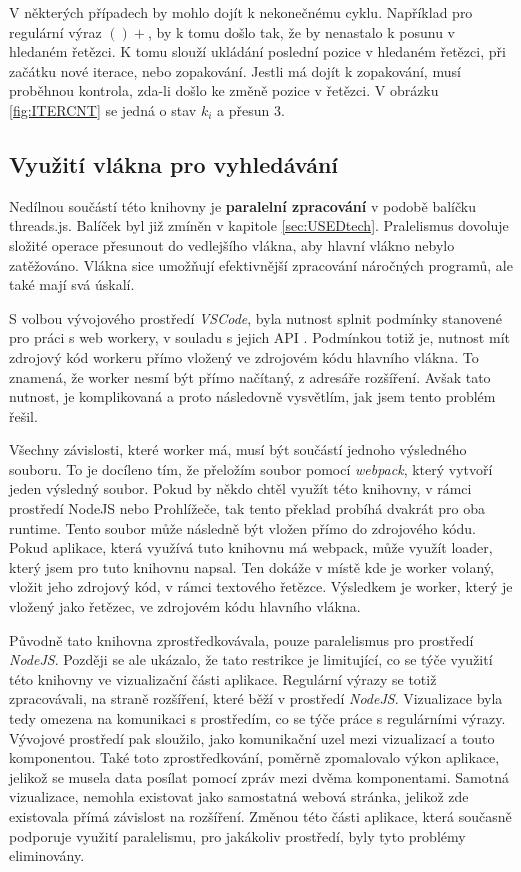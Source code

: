 V některých případech by mohlo dojít k nekonečnému cyklu.
Například pro regulární výraz $()+$, by k tomu došlo tak, že by nenastalo k posunu v hledaném řetězci.
K tomu slouží ukládání poslední pozice v hledaném řetězci, při začátku nové iterace, nebo zopakování.
Jestli má dojít k zopakování, musí proběhnou kontrola, zda-li došlo ke změně pozice v řetězci.
V obrázku \ref{fig:ITERCNT} se jedná o stav $k_i$ a přesun $3$.

\subsection*{Využití vlákna pro vyhledávání}
Nedílnou součástí této knihovny je \textbf{paralelní zpracování} v podobě balíčku threads.js.
Balíček byl již zmíněn v kapitole \ref{sec:USEDtech}.
Pralelismus dovoluje složité operace přesunout do vedlejšího vlákna, aby hlavní vlákno nebylo zatěžováno.
Vlákna sice umožňují efektivnější zpracování náročných programů, ale také mají svá úskalí.

S volbou vývojového prostředí \textit{VSCode}, byla nutnost splnit podmínky stanovené pro práci s web workery, v souladu s jejich API \cite{Microsoft_2021}. 
Podmínkou totiž je, nutnost mít zdrojový kód workeru přímo vložený ve zdrojovém kódu hlavního vlákna.
To znamená, že worker nesmí být přímo načítaný, z adresáře rozšíření.
Avšak tato nutnost, je komplikovaná a proto následovně vysvětlím, jak jsem tento problém řešil.

Všechny závislosti, které worker má, musí být součástí jednoho výsledného souboru.
To je docíleno tím, že přeložím soubor pomocí \textit{webpack}, který vytvoří jeden výsledný soubor.
Pokud by někdo chtěl využít této knihovny, v rámci prostředí NodeJS nebo Prohlížeče, 
tak tento překlad probíhá dvakrát pro oba runtime.
Tento soubor může následně být vložen přímo do zdrojového kódu.
Pokud aplikace, která využívá tuto knihovnu má webpack, 
může využít loader, který jsem pro tuto knihovnu napsal. 
Ten dokáže v místě kde je worker volaný, vložit jeho zdrojový kód, v rámci textového řetězce.
Výsledkem je worker, který je vložený jako řetězec, ve zdrojovém kódu hlavního vlákna.

Původně tato knihovna zprostředkovávala, pouze paralelismus pro prostředí \textit{NodeJS}.
Později se ale ukázalo, že tato restrikce je limitující, co se týče využití této knihovny ve vizualizační části aplikace.
Regulární výrazy se totiž zpracovávali, na straně rozšíření, které běží v prostředí \textit{NodeJS}.
Vizualizace byla tedy omezena na komunikaci s prostředím, co se týče práce s regulárními výrazy.
Vývojové prostředí pak sloužilo, jako komunikační uzel mezi vizualizací a touto komponentou.
Také toto zprostředkování, poměrně zpomalovalo výkon aplikace, jelikož se musela data posílat pomocí zpráv mezi dvěma komponentami.
Samotná vizualizace, nemohla existovat jako samostatná webová stránka, jelikož zde existovala přímá závislost na rozšíření.
Změnou této části aplikace, která současně podporuje využití paralelismu, pro jakákoliv prostředí, byly tyto problémy eliminovány.

